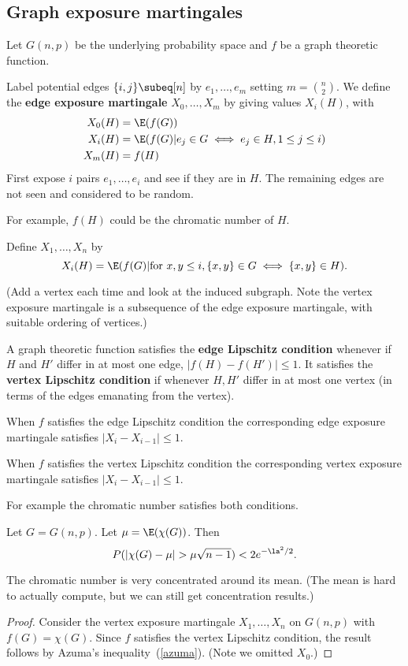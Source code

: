 \subsection{Graph exposure martingales}
Let $G(n,p)$ be the underlying probability space and $f$ be a graph theoretic function. 
\begin{df}
Label potential edges $\{i,j\}\subeq [n]$ by $e_1,\ldots, e_m$ setting $m=\binom n2$. 
We define the \textbf{edge exposure martingale} $X_0,\ldots, X_m$ by giving values $X_i(H)$, with
\begin{align*}
X_0(H)&=\E(f(G))\\
X_i(H)&=\E(f(G)|e_j\in G\iff e_j\in H,1\le j\le i)\\
X_m(H)&=f(H)
\end{align*}
First expose $i$ pairs $e_1,\ldots, e_i$ and see if they are in $H$. The remaining edges are not seen and considered to be random.
\end{df}
For example, $f(H)$ could be the chromatic number of $H$.
\begin{df}
Define $X_1,\ldots, X_n$ by
\[
X_i(H)=\E(f(G)|\text{for }x,y\le i,\{x,y\}\in G\iff \{x,y\} \in H).
\]
\end{df}
(Add a vertex each time and look at the induced subgraph. Note the vertex exposure martingale is a subsequence of the edge exposure martingale, with suitable ordering of vertices.)

\begin{df}
A graph theoretic function satisfies the \textbf{edge Lipschitz condition} whenever if $H$ and $H'$ differ in at most one edge, $|f(H)-f(H')|\le 1$. It satisfies the \textbf{vertex Lipschitz condition} if whenever $H, H'$ differ in at most one vertex (in terms of the edges emanating from the vertex).
\end{df}
\begin{thm}
When $f$ satisfies the edge Lipschitz condition the corresponding edge exposure martingale satisfies $|X_i-X_{i-1}|\le 1$.

When $f$ satisfies the vertex Lipschitz condition the corresponding vertex exposure martingale satisfies $|X_i-X_{i-1}|\le 1$.
\end{thm}
For example the chromatic number satisfies both conditions.
\begin{thm}
Let $G=G(n,p)$. Let $\mu=\E(\chi(G))$. Then
\[
P(|\chi(G)-\mu|>\mu\sqrt{n-1})<2e^{-\la^2/2}.
\]
\end{thm}
The chromatic number is very concentrated around its mean. (The mean is hard to actually compute, but we can still get concentration results.)
\begin{proof}
Consider the vertex exposure martingale $X_1,\ldots, X_n$ on $G(n,p)$ with $f(G)=\chi (G)$. Since $f$ satisfies the vertex Lipschitz condition, the result follows by Azuma's inequality~(\ref{azuma}). (Note we omitted $X_0$.)
\end{proof}
